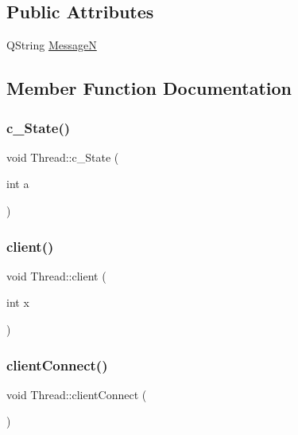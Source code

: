 \subsection*{Public Attributes}
\begin{DoxyCompactItemize}
\item 
Q\+String \mbox{\hyperlink{class_thread_a15698411cab05d061db35b2cc3e4299e}{MessageN}}
\end{DoxyCompactItemize}


\subsection{Member Function Documentation}
\mbox{\label{class_thread_a9277677620d5ddb091b7b2c1bf06d3de}} 
\subsubsection{\texorpdfstring{c\+\_\+\+State()}{c\_State()}}
{\footnotesize\ttfamily void Thread\+::c\+\_\+\+State (\begin{DoxyParamCaption}\item[{int}]{a }\end{DoxyParamCaption})}

\mbox{\label{class_thread_ac4eb870d2e959ed19546eb2776ccd4f0}} 
\subsubsection{\texorpdfstring{client()}{client()}}
{\footnotesize\ttfamily void Thread\+::client (\begin{DoxyParamCaption}\item[{int}]{x }\end{DoxyParamCaption})}

\mbox{\label{class_thread_a580dfe219e95afd325ddad77e2a59fef}} 
\subsubsection{\texorpdfstring{client\+Connect()}{clientConnect()}}
{\footnotesize\ttfamily void Thread\+::client\+Connect (\begin{DoxyParamCaption}{ }\end{DoxyParamCaption})}

